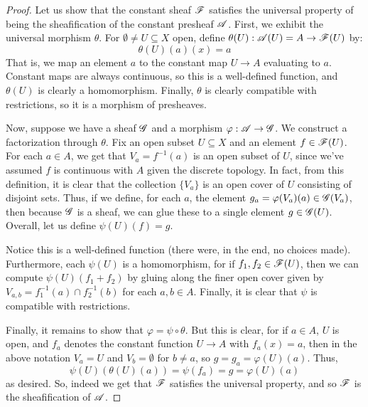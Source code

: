 \begin{proof}
	Let us show that the constant sheaf $\mathscr{F}$ satisfies the universal property of being the sheafification of the constant presheaf $\mathscr{A}$. First, we exhibit the universal morphism $\theta$. For $\emptyset \neq U \subseteq X$ open, define $\theta(U) : \mathscr{A}(U) = A \to \mathscr{F}(U)$ by:
	\[ \theta(U)(a)(x) = a \]
	That is, we map an element $a$ to the constant map $U \to A$ evaluating to $a$. Constant maps are always continuous, so this is a well-defined function, and $\theta(U)$ is clearly a homomorphism. Finally, $\theta$ is clearly compatible with restrictions, so it is a morphism of presheaves.
	
	Now, suppose we have a sheaf $\mathscr{G}$ and a morphism $\varphi : \mathscr{A} \to \mathscr{G}$. We construct a factorization through $\theta$. Fix an open subset $U \subseteq X$ and an element $f \in \mathscr{F}(U)$. For each $a \in A$, we get that $V_a = f^{-1}(a)$ is an open subset of $U$, since we've assumed $f$ is continuous with $A$ given the discrete topology. In fact, from this definition, it is clear that the collection $\{V_a\}$ is an open cover of $U$ consisting of disjoint sets. Thus, if we define, for each $a$, the element $g_a = \varphi(V_a)(a) \in \mathscr{G}(V_a)$, then because $\mathscr{G}$ is a sheaf, we can glue these to a single element $g \in \mathscr{G}(U)$. Overall, let us define $\psi(U)(f) = g$.	
	
	Notice this is a well-defined function (there were, in the end, no choices made). Furthermore, each $\psi(U)$ is a homomorphism, for if $f_1,f_2 \in \mathscr{F}(U)$, then we can compute $\psi(U)(f_1+f_2)$ by gluing along the finer open cover given by $V_{a,b} = f_1^{-1}(a) \cap f_2^{-1}(b)$ for each $a,b \in A$. Finally, it is clear that $\psi$ is compatible with restrictions.
	
	Finally, it remains to show that $\varphi = \psi \circ \theta$. But this is clear, for if $a \in A$, $U$ is open, and $f_a$ denotes the constant function $U \to A$ with $f_a(x) = a$, then in the above notation $V_a = U$ and $V_b = \emptyset$ for $b \neq a$, so $g = g_a = \varphi(U)(a)$. Thus,
	\[ \psi(U)(\theta(U)(a)) = \psi(f_a) = g = \varphi(U)(a) \]
	as desired. So, indeed we get that $\mathscr{F}$ satisfies the universal property, and so $\mathscr{F}$ is the sheafification of $\mathscr{A}$.
\end{proof}
